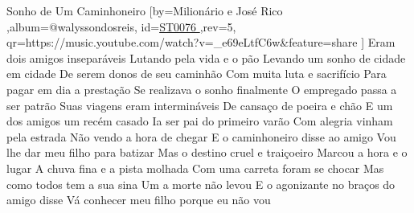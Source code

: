 \beginsong
{Sonho de Um Caminhoneiro %
}[by={Milionário e José Rico %
},album={@walyssondosreis},
id={\href{https://music.youtube.com/watch?v=_e69eLtfC6w&feature=share %
}{ST0076 %
}},rev={5}, %
qr={https://music.youtube.com/watch?v=_e69eLtfC6w&feature=share %
}]
\beginverse
Eram dois amigos inseparáveis
Lutando pela vida e o pão
Levando um sonho de cidade em cidade
De serem donos de seu caminhão
Com muita luta e sacrifício
Para pagar em dia a prestação
Se realizava o sonho finalmente
O empregado passa a ser patrão
\endverse
\beginverse
Suas viagens eram intermináveis
De cansaço de poeira e chão
E um dos amigos um recém casado
Ia ser pai do primeiro varão
Com alegria vinham pela estrada
Não vendo a hora de chegar
E o caminhoneiro disse ao amigo
Vou lhe dar meu filho para batizar
\endverse
\beginverse
Mas o destino cruel e traiçoeiro
Marcou a hora e o lugar
A chuva fina e a pista molhada
Com uma carreta foram se chocar
Mas como todos tem a sua sina
Um a morte não levou
E o agonizante no braços do amigo disse
Vá conhecer meu filho porque eu não vou
\endverse
{}

